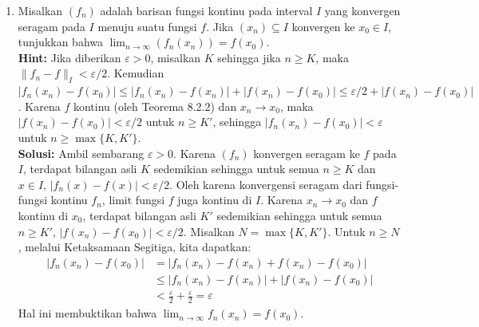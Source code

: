 ﻿\documentclass{article}
\begin{document}
\begin{enumerate}
        \vspace{0.5cm}
  \item[4.] Misalkan $(f_n)$ adalah barisan fungsi kontinu pada interval $I$ yang konvergen seragam pada $I$ menuju suatu fungsi $f$. Jika $(x_n) \subseteq I$ konvergen ke $x_0 \in I$, tunjukkan bahwa $\lim_{n \to \infty} (f_n(x_n)) = f(x_0)$.\\
        \textbf{Hint:} Jika diberikan $\varepsilon > 0$, misalkan $K$ sehingga jika $n \ge K$, maka $\|f_n - f\|_I < \varepsilon/2$. Kemudian $|f_n(x_n) - f(x_0)| \le |f_n(x_n) - f(x_n)| + |f(x_n) - f(x_0)| \le \varepsilon/2 + |f(x_n) - f(x_0)|$. Karena $f$ kontinu (oleh Teorema 8.2.2) dan $x_n \to x_0$, maka $|f(x_n) - f(x_0)| < \varepsilon/2$ untuk $n \ge K'$, sehingga $|f_n(x_n) - f(x_0)| < \varepsilon$ untuk $n \ge \max\{K, K'\}$.\\
        \textbf{Solusi:}
        Ambil sembarang $\varepsilon > 0$. Karena $(f_n)$ konvergen seragam ke $f$ pada $I$, terdapat bilangan asli $K$ sedemikian sehingga untuk semua $n \ge K$ dan $x \in I$, $|f_n(x) - f(x)| < \varepsilon/2$.
        Oleh karena konvergensi seragam dari fungsi-fungsi kontinu $f_n$, limit fungsi $f$ juga kontinu di $I$. Karena $x_n \to x_0$ dan $f$ kontinu di $x_0$, terdapat bilangan asli $K'$ sedemikian sehingga untuk semua $n \ge K'$, $|f(x_n) - f(x_0)| < \varepsilon/2$.
        Misalkan $N = \max\{K, K'\}$. Untuk $n \ge N$, melalui Ketaksamaan Segitiga, kita dapatkan:
        \begin{align*}
          |f_n(x_n) - f(x_0)| & = |f_n(x_n) - f(x_n) + f(x_n) - f(x_0)|                       \\
                              & \le |f_n(x_n) - f(x_n)| + |f(x_n) - f(x_0)|                   \\
                              & < \frac{\varepsilon}{2} + \frac{\varepsilon}{2} = \varepsilon
        \end{align*}
        Hal ini membuktikan bahwa $\lim_{n \to \infty} f_n(x_n) = f(x_0)$.


\end{enumerate}
\end{document}
